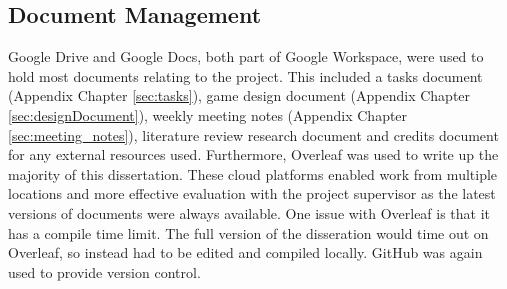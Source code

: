 \subsection{Document Management}
Google Drive and Google Docs, both part of Google Workspace, were used to hold most documents relating to the project. This included a tasks document (Appendix Chapter \ref{sec:tasks}), game design document (Appendix Chapter \ref{sec:designDocument}), weekly meeting notes (Appendix Chapter \ref{sec:meeting_notes}), literature review research document and credits document for any external resources used. Furthermore, Overleaf was used to write up the majority of this dissertation. These cloud platforms enabled work from multiple locations and more effective evaluation with the project supervisor as the latest versions of documents were always available. One issue with Overleaf is that it has a compile time limit. The full version of the disseration would time out on Overleaf, so instead had to be edited and compiled locally. GitHub was again used to provide version control.